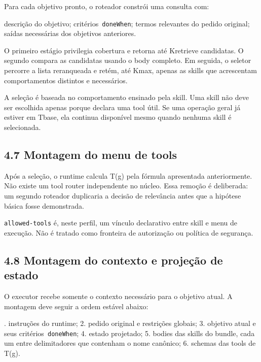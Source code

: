 \documentclass[12pt,a4paper]{article}
\begin{document}
Para cada objetivo pronto, o roteador constrói uma consulta com:


\noindent \textbullet{} descrição do objetivo; \textbullet{} critérios\texttt{ doneWhen}; \textbullet{} termos relevantes do pedido original; \textbullet{} saídas necessárias dos objetivos anteriores.\par

O primeiro estágio privilegia cobertura e retorna até Kretrieve candidatas. O segundo compara as candidatas usando o body completo. Em seguida, o seletor percorre a lista reranqueada e retém, até Kmax, apenas as skills que acrescentam comportamentos distintos e necessários.




A seleção é baseada no comportamento ensinado pela skill. Uma skill não deve ser escolhida apenas porque declara uma tool útil. Se uma operação geral já estiver em Tbase, ela continua disponível mesmo quando nenhuma skill é selecionada.



\subsection*{4.7 Montagem do menu de tools}

Após a seleção, o runtime calcula T(g) pela fórmula apresentada anteriormente. Não existe um tool router independente no núcleo. Essa remoção é deliberada: um segundo roteador duplicaria a decisão de relevância antes que a hipótese básica fosse demonstrada.




\texttt{allowed-tools} é, neste perfil, um vínculo declarativo entre skill e menu de execução. Não é tratado como fronteira de autorização ou política de segurança.

\subsection*{4.8 Montagem do contexto e projeção de estado}

O executor recebe somente o contexto necessário para o objetivo atual. A montagem deve seguir a ordem estável abaixo:


. instruções do runtime; 2. pedido original e restrições globais; 3. objetivo atual e seus critérios\texttt{ doneWhen}; 4. estado projetado; 5. bodies das skills do bundle, cada um entre delimitadores que contenham o nome canônico; 6. schemas das tools de T(g).\par
\end{document}

